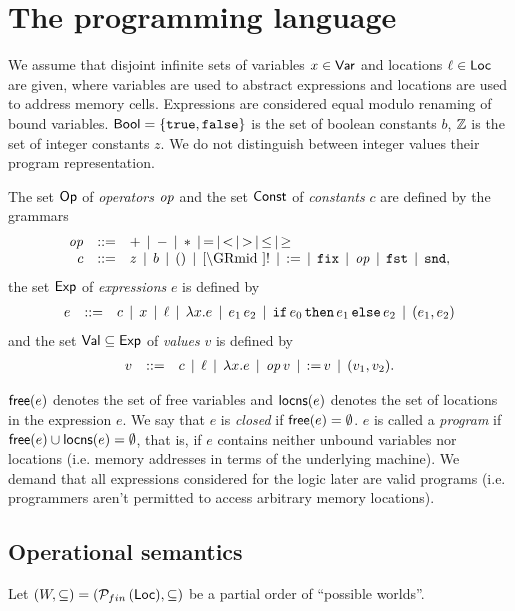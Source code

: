 \documentclass[12pt,a4paper]{article}
\begin{document}
\section{The programming language}

We assume that disjoint infinite sets of variables $x \in \mathsf{Var}$ and locations $\ell \in \mathsf{Loc}$ are given,
where variables are used to abstract expressions and locations are used to address memory cells.
Expressions are considered equal modulo renaming of bound variables. $\mathsf{Bool}=\{\mathtt{true},\mathtt{false}\}$ is
the set of boolean constants $b$, $\mathbb Z$ is the set of integer constants $z$. We do not distinguish
between integer values their program representation.

\begin{definition}[Expressions]
  The set $\mathsf{Op}$ of {\em operators} $\mathit{op}$ and the set $\mathsf{Const}$ of {\em constants} $c$ are defined by
  the grammars
  \[\GRbeg
  \op \GRis + \GRmid - \GRmid * \GRmid = \GRmid < \GRmid > \GRmid \le \GRmid \ge \\
  c \GRis z \GRmid b \GRmid \unit \GRmid \cref \GRmid ! \GRmid \assign \GRmid \fix \GRmid \op \GRmid \fst \GRmid \snd,
  \GRend\]
  the set $\mathsf{Exp}$ of {\em expressions} $e$ is defined by
  \[\begin{array}{rrlll}
  e & ::= & c \,\mid\, x \,\mid\, \ell \,\mid\, \lambda x.e \,\mid\, e_1\,e_2
  \,\mid\, \mathtt{if}\,e_0\,\mathtt{then}\,e_1\,\mathtt{else}\,e_2 \,\mid\, (e_1,e_2)
  \end{array}\]
  and the set $\mathsf{Val} \subseteq \mathsf{Exp}$ of {\em values} $v$ is defined by
  \[\begin{array}{rrlll}
  v & ::= & c \,\mid\, \ell \,\mid\, \lambda x.e \,\mid\, \mathit{op}\,v \,\mid\, \mathtt{:=}\,v \,\mid\, (v_1,v_2).
  \end{array}\]
\end{definition}

$\mathsf{free}(e)$ denotes the set of free variables and $\mathsf{locns}(e)$ denotes the set of locations in the expression $e$.
We say that $e$ is {\em closed} if $\mathsf{free}(e)=\emptyset$. $e$ is called a {\em program} if
$\mathsf{free}(e)\cup\mathsf{locns}(e)=\emptyset$, that is, if $e$ contains neither unbound variables nor locations (i.e.
memory addresses in terms of the underlying machine). We demand that all expressions considered for the
logic later are valid programs (i.e. programmers aren't permitted to access arbitrary memory locations).


\subsection{Operational semantics}

Let $(W,\subseteq) = (\mathcal{P}_{fin}\,(\mathsf{Loc}),\subseteq)$ be a partial order of ``possible worlds''.
\end{document}

